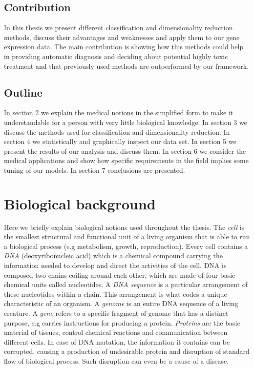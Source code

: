 \documentclass[12pt, wide]{mwart}
\begin{document}
\subsection{Contribution}

In this thesis we present different classification and dimensionality reduction methods, discuss their advantages and weaknesses and apply them to our gene expression data. The main contribution is showing how this methods could help in providing automatic diagnosis and deciding about potential highly toxic treatment and that previously used methods are outperformed by our framework.   

\subsection{Outline}
In section 2 we explain the medical notions in the simplified form to make it understandable for a person with very little biological knowledge. In section 3 we discuss the methods used for classification and dimensionality reduction. In section 4 we statistically and graphically inspect our data set. In section 5 we present the results of our analysis and discuss them. In section 6 we consider the medical applications and show how specific requirements in the field implies some tuning of our models. In section 7 conclusions are presented.

\noindent

\section{Biological background}

Here we briefly explain biological notions used throughout the thesis. The \textit{cell} is the smallest structural and functional unit of a living organism that is able to run a biological process (e.g metabolism, growth, reproduction). Every cell contains a \textit{DNA} (deoxyribonucleic acid) which is a chemical compound carrying the information needed to develop and direct the activities of the cell. DNA is composed two chains coiling around each other, which are made of four basic chemical units called nucleotides. A \textit{DNA sequence} is a particular arrangement of these nucleotides within a chain. This arrangement is what codes a unique characteristic of an organism. A \textit{genome} is an entire DNA sequence of a living creature. A \textit{gene} refers to a specific fragment of genome that has a distinct purpose, e.g carries instructions for producing a protein. \textit{Proteins} are the basic material of tissues, control chemical reactions and communication between different cells. In case of DNA mutation, the information it contains can be corrupted, causing a production of undesirable protein and disruption of standard flow of biological process. Such disruption can even be a cause of a disease.
\end{document}
